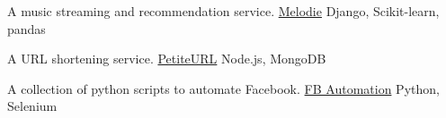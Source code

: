 

\begin{cventries}

  \cventry
    {A music streaming and recommendation service.} %
    {\href{https://github.com/rajdeepbharati/Melodie}{Melodie}} %
    {Django, Scikit-learn, pandas} %
    {} %
    {
      \begin{cvitems} %
      \end{cvitems}
    }

  \cventry
    {A URL shortening service.} %
    {\href{https://github.com/rajdeepbharati/PetiteURL}{PetiteURL}} %
    {Node.js, MongoDB} %
    {} %
    {
      \begin{cvitems} %
      \end{cvitems}
    }
    
  \cventry
    {A collection of python scripts to automate Facebook.} %
    {\href{https://github.com/rajdeepbharati/FB-Automation}{FB Automation}} %
    {Python, Selenium} %
    {} %
    {
      \begin{cvitems} %
      \end{cvitems}
    }


\end{cventries}
